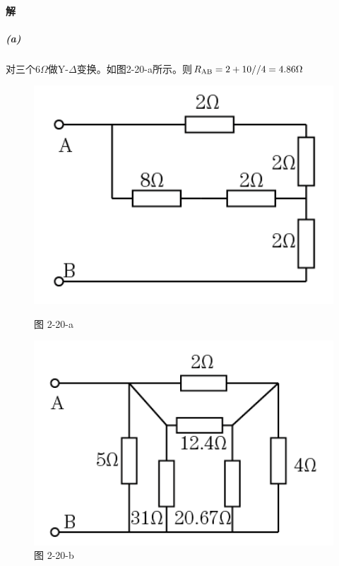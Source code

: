 \documentclass[hyperref, UTF8]{ctexart}
\begin{document}
\paragraph{解}
\subparagraph{(a)}对三个$6\Omega$做Y-$\Delta$变换。如图2-20-a所示。则$R_{\rm AB}=2+10//4=4.86\Omega$
\begin{figure}[!htb]
  \centering
  \begin{minipage}[t]{0.241\textwidth}
    \centering
    \includegraphics[width=1\textwidth]{p2-20-a-sol.png}
    \caption*{图 2-20-a}
  \end{minipage}
  \begin{minipage}[t]{0.254\textwidth}
    \centering
    \includegraphics[width=1\textwidth]{p2-20-b-sol.png}
    \caption*{图 2-20-b}
  \end{minipage}
  \begin{minipage}[t]{0.187\textwidth}

\end{minipage}
\end{figure}
\end{document}
